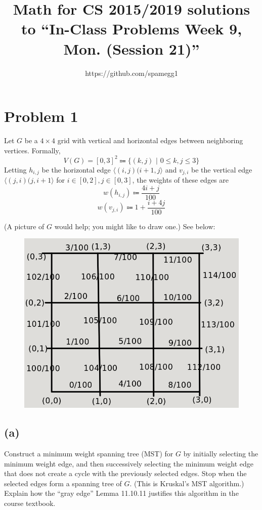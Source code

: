 \documentclass[14pt]{extarticle}
\title{Math for CS 2015/2019 solutions to ``In-Class Problems Week 9, Mon. (Session 21)''}
\author{https://github.com/spamegg1}
\begin{document}
\maketitle
\tableofcontents

\section{Problem 1}
Let $G$ be a $4 \times 4$ grid with vertical and horizontal edges between neighboring vertices. Formally,
$$
V(G) = [0,3]^2 \Coloneqq \{(k, j) \,\, | \,\, 0 \leq k, j \leq 3\}
$$
Letting $h_{i,j}$ be the horizontal edge $\langle (i, j) (i + 1, j\rangle$ and $v_{j,i}$ be the vertical edge $\langle (j, i) (j, i + 1\rangle$ for $i \in [0,2], j \in [0,3]$, the weights of these edges are
$$
w(h_{i,j}) \Coloneqq \frac{4i + j}{100}
$$
$$
w(v_{j,i}) \Coloneqq 1 + \frac{i + 4j}{100}
$$

(A picture of $G$ would help; you might like to draw one.) See below:

\begin{figure}[ht!]
\centering
\includegraphics[scale=0.5]{mst-1.png}
\end{figure}

\subsection{(a)}
Construct a minimum weight spanning tree (MST) for $G$ by initially selecting the minimum weight edge, and then successively selecting the minimum weight edge that does not create a cycle with the previously selected edges. Stop when the selected edges form a spanning tree of $G$. (This is Kruskal’s MST algorithm.) Explain how the “gray edge” Lemma 11.10.11 justifies this algorithm in the course textbook.
\end{document}
